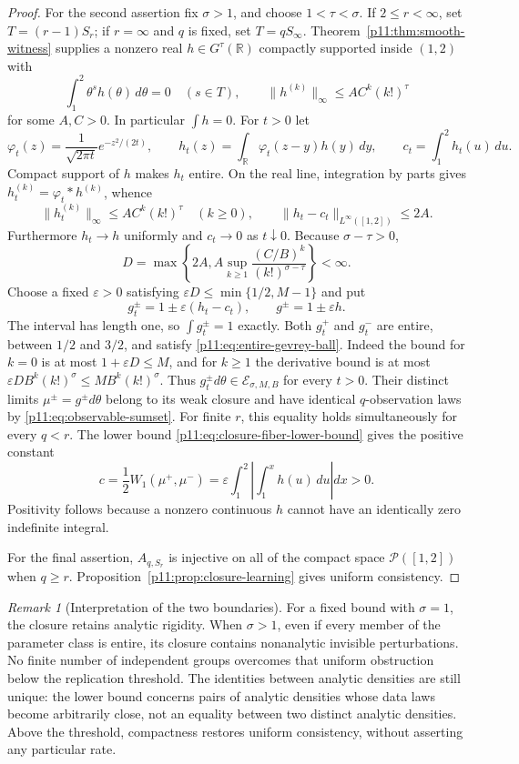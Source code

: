 \documentclass[11pt,letterpaper]{article}
\theoremstyle{definition}
\theoremstyle{remark}
\newtheorem{remark}[theorem]{Remark}
\newcommand{\1}{\mathbf 1}
\begin{document}
\begin{proof}
For the second assertion fix $\sigma>1$, and choose
$1<\tau<\sigma$.  If $2\leq r<\infty$, set $T=(r-1)S_r$;
if $r=\infty$ and $q$ is fixed, set $T=qS_\infty$.
Theorem~\ref{p11:thm:smooth-witness} supplies a nonzero real
$h\in G^\tau(\mathbb R)$ compactly supported inside $(1,2)$ with
\[
 \int_1^2\theta^s h(\theta)\,d\theta=0\quad(s\in T),
 \qquad \|h^{(k)}\|_\infty\leq A C^k(k!)^\tau
\]
for some $A,C>0$.  In particular $\int h=0$.
For $t>0$ let
\[
 \varphi_t(z)=\frac{1}{\sqrt{2\pi t}}e^{-z^2/(2t)},\qquad
 h_t(z)=\int_{\mathbb R}\varphi_t(z-y)h(y)\,dy,\qquad
 c_t=\int_1^2h_t(u)\,du.
\]
Compact support of $h$ makes $h_t$ entire.  On the real line,
integration by parts gives $h_t^{(k)}=\varphi_t*h^{(k)}$, whence
\[
 \|h_t^{(k)}\|_\infty\leq A C^k(k!)^\tau
 \quad(k\geq0),\qquad
 \|h_t-c_t\|_{L^\infty([1,2])}\leq2A.
\]
Furthermore $h_t\to h$ uniformly and $c_t\to0$ as $t\downarrow0$.
Because $\sigma-\tau>0$,
\[
 D=\max\left\{2A,
       A\sup_{k\geq1}\frac{(C/B)^k}{(k!)^{\sigma-\tau}}\right\}<\infty.
\]
Choose a fixed $\varepsilon>0$ satisfying
$\varepsilon D\leq\min\{1/2,M-1\}$ and put
\[
 g_t^\pm=1\pm\varepsilon(h_t-c_t),\qquad
 g^\pm=1\pm\varepsilon h.
\]
The interval has length one, so $\int g_t^\pm=1$ exactly.
Both $g_t^+$ and $g_t^-$ are entire, between $1/2$ and $3/2$,
and satisfy \eqref{p11:eq:entire-gevrey-ball}.  Indeed the bound for
$k=0$ is at most $1+\varepsilon D\leq M$, and for $k\geq1$
the derivative bound is at most
$\varepsilon D B^k(k!)^\sigma\leq MB^k(k!)^\sigma$.
Thus $g_t^\pm d\theta\in\mathcal E_{\sigma,M,B}$ for every $t>0$.
Their distinct limits $\mu^\pm=g^\pm d\theta$ belong to its weak
closure and have identical $q$-observation laws by
\eqref{p11:eq:observable-sumset}.  For finite $r$, this equality holds
simultaneously for every $q<r$.  The lower bound
\eqref{p11:eq:closure-fiber-lower-bound} gives the positive constant
\begin{equation}\label{p11:eq:explicit-regularity-floor}
 c=\frac12W_1(\mu^+,\mu^-)
   =\varepsilon\int_1^2
          \left|\int_1^x h(u)\,du\right|dx>0.
\end{equation}
Positivity follows because a nonzero continuous $h$ cannot have an
identically zero indefinite integral.

For the final assertion, $A_{q,S_r}$ is injective on all of the
compact space $\mathcal P([1,2])$ when $q\geq r$.
Proposition~\ref{p11:prop:closure-learning} gives uniform consistency.
\end{proof}

\begin{remark}[Interpretation of the two boundaries]
For a fixed bound with $\sigma=1$, the closure retains analytic
rigidity.  When $\sigma>1$, even if every member of the parameter
class is entire, its closure contains nonanalytic invisible
perturbations.  No finite number of independent groups overcomes
that uniform obstruction below the replication threshold.
The identities between analytic densities are still unique: the
lower bound concerns pairs of analytic densities whose data laws
become arbitrarily close, not an equality between two distinct
analytic densities.  Above the threshold, compactness restores
uniform consistency, without asserting any particular rate.
\end{remark}
\end{document}
